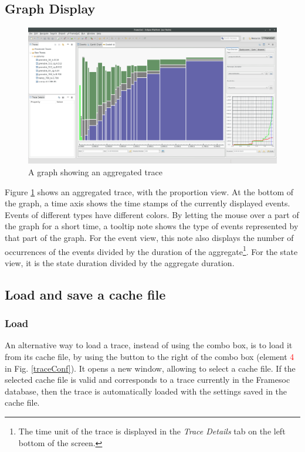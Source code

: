 \documentclass[twoside]{article}
\begin{document}
\begin{sloppypar}
\subsection{Graph Display}
\begin{figure}[h!]
	\centering
	\includegraphics[width=1.0\textwidth]{images/ocelotl_aggregated.png}
	\caption{A graph showing an aggregated trace}
	\label{showAggreg}
\end{figure}

Figure \ref{showAggreg} shows an aggregated trace, with the proportion view. At the bottom of the graph, a time axis shows the time stamps of the currently displayed events. Events of different types have different colors. By letting the mouse over a part of the graph for a short time, a tooltip note shows the type of events represented by that part of the graph. For the event view, this note also displays the number of occurrences of the events divided by the duration of the aggregate\footnote{The time unit of the trace is displayed in the \textit{Trace Details} tab on the left bottom of the screen.}. For the state view, it is the state duration divided by the aggregate duration.


\subsection{Load and save a cache file}
\subsubsection{Load}
An alternative way to load a trace, instead of using the combo box, is to load it from its cache file, by using the button to the right of the combo box (element \textcolor{red}{4} in Fig. \ref{traceConf}). It opens a new window, allowing to select a cache file. If the selected cache file is valid and corresponds to a trace currently in the Framesoc database, then the trace is automatically loaded with the settings saved in the cache file.


\end{sloppypar}
\end{document}
